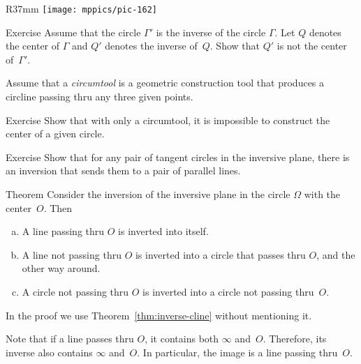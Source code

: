 \begin{wrapfigure}[7]{R}{37mm}
\vskip-0mm
\centering
\texttt{[image: mppics/pic-162]}
\end{wrapfigure}

\begin{thm}{Exercise}\label{ex:inv-center not=center-inv}
Assume that the circle $\Gamma'$ is the inverse of the circle $\Gamma$.
Let $Q$ denotes the center of $\Gamma$ and $Q'$ denotes the inverse of~$Q$.
Show that $Q'$ is not the center of~$\Gamma'$.
\end{thm}



Assume that a {}\emph{circumtool} is a geometric construction tool 
that produces a circline passing thru any three given points.

\begin{thm}{Exercise}\label{ex:circumtool}
Show that with only a circumtool,
it is impossible to construct the center of a given circle.
\end{thm}

\begin{thm}{Exercise}\label{ex:tangent-circ->parallels}
Show that for any pair of tangent circles in the inversive plane, there is an inversion that sends them to a pair of parallel lines.
\end{thm}

\begin{thm}{Theorem}\label{thm:inverse}
Consider the inversion of the inversive plane 
in the circle $\Omega$ with the center~$O$. 
Then 
\begin{enumerate}[(a)]
\item\label{thm:inverse:line-line}
A line passing thru $O$ is inverted into itself.
\item\label{thm:inverse:line} 
A line not passing thru $O$ is inverted into a circle that passes thru $O$, and the other way around.
\item\label{thm:inverse:circle} 
A circle not passing thru $O$ 
is inverted into a circle not passing thru~$O$. 
\end{enumerate}
\end{thm}

In the proof we use Theorem~\ref{thm:inverse-cline} without mentioning it.

Note that if a line passes thru $O$, it contains both $\infty$ and~$O$.
Therefore, its inverse also contains $\infty$ and~$O$.
In particular, the image is a line passing thru~$O$.

